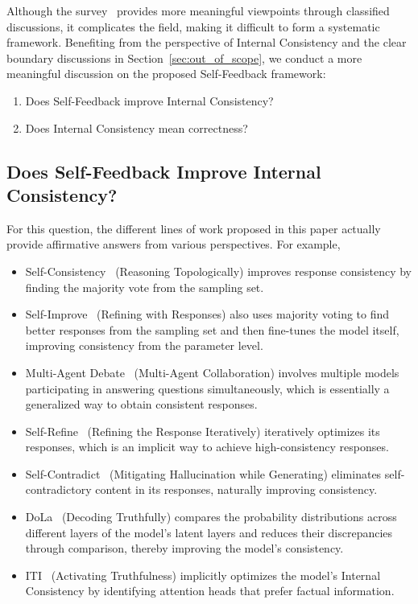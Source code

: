 \documentclass[lettersize,journal]{IEEEtran}
\begin{document}
Although the survey~\cite{SurveySelfCorrection_24_arXiv_PSU} provides more meaningful viewpoints through classified discussions, it complicates the field, making it difficult to form a systematic framework. Benefiting from the perspective of Internal Consistency and the clear boundary discussions in Section~\ref{sec:out_of_scope}, we conduct a more meaningful discussion on the proposed Self-Feedback framework: 

\begin{enumerate}
    \item Does Self-Feedback improve Internal Consistency?
    \item Does Internal Consistency mean correctness?
\end{enumerate}


\subsection{Does Self-Feedback Improve Internal Consistency?}


\noindent For this question, the different lines of work proposed in this paper actually provide affirmative answers from various perspectives. For example,

\begin{itemize}
    \item Self-Consistency~\cite{SelfConsistency_23_ICLR_Google} (Reasoning Topologically) improves response consistency by finding the majority vote from the sampling set. 
    \item Self-Improve~\cite{SelfImprove_23_EMNLP_Illinois} (Refining with Responses) also uses majority voting to find better responses from the sampling set and then fine-tunes the model itself, improving consistency from the parameter level.
    \item Multi-Agent Debate~\cite{Debate_23_arXiv_MIT} (Multi-Agent Collaboration) involves multiple models participating in answering questions simultaneously, which is essentially a generalized way to obtain consistent responses. 
    \item Self-Refine~\cite{SelfRefine_23_NeuIPS_CMU} (Refining the Response Iteratively) iteratively optimizes its responses, which is an implicit way to achieve high-consistency responses. 
    \item Self-Contradict~\cite{HalluSelfContradictory_24_ICLR_ETH} (Mitigating Hallucination while Generating) eliminates self-contradictory content in its responses, naturally improving consistency. 
    \item DoLa~\cite{DoLa_24_ICLR_MIT} (Decoding Truthfully) compares the probability distributions across different layers of the model's latent layers and reduces their discrepancies through comparison, thereby improving the model's consistency.
    \item ITI~\cite{ITI_23_NeuIPS_Harvard} (Activating Truthfulness) implicitly optimizes the model's Internal Consistency by identifying attention heads that prefer factual information.
\end{itemize}
\end{document}
